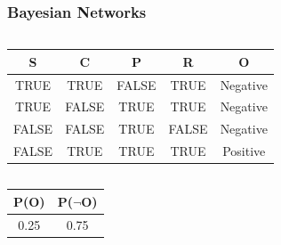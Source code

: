 \documentclass[aspectratio=169, 10pt]{beamer}
\begin{document}
\begin{frame}[t]
    \frametitle{Bayesian Networks}

    \begin{columns}[]
        \begin{column}[]{0.5\textwidth}
            \begin{table}[]
                \small
                \begin{tabular}{cccc|c}
                \textbf{S} & \textbf{C} & \textbf{P} & \textbf{R} & \textbf{O} \\ \hline
                TRUE       & TRUE       & FALSE      & TRUE       & Negative   \\
                TRUE       & FALSE      & TRUE       & TRUE       & Negative   \\
                FALSE      & FALSE      & TRUE       & FALSE      & Negative   \\
                FALSE      & TRUE       & TRUE       & TRUE       & Positive  
                \end{tabular}
            \end{table}
        \end{column}
        \begin{column}[]{0.5\textwidth}
            \begin{figure}
                \center
            \end{figure}
        \end{column}
    \end{columns}

    \begin{table}[]
        \small
        \begin{tabular}{cc}
        P(O) & P($\neg$O) \\ \hline
        0.25 & 0.75 \\
        \end{tabular}
    \end{table}


\end{frame}
\end{document}

